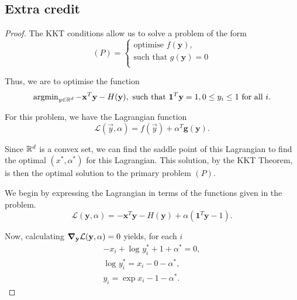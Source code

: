 \documentclass{article}
\begin{document}
\subsection{Extra credit}
\begin{proof}
    The KKT conditions allow us to solve a problem of the form
    \begin{equation*}
        (P) = \begin{cases}
            \text{optimise } f(\mathbf{y}),\\
            \text{such that } g(\mathbf{y}) = 0\\
            \end{cases}
    \end{equation*}

    Thus, we are to optimise the function
    \begin{equation*}
        \operatorname{argmin}_{y \in \mathbb{R}^{d}} - \mathbf{x}^{T}\mathbf{y} - H(\mathbf{y}),
        \text{ such that } \mathbf{1}^{T}\mathbf{y} = 1, 0 \leq y_{i} \leq 1 \text{ for all } i.
    \end{equation*}

    For this problem, we have the Lagrangian function
    \begin{equation*}
        \mathcal{L} (\vec{y}, \alpha) = f(\vec{y}) + \alpha^{T}\mathbf{g}(\mathbf{y}).
    \end{equation*}

    Since $\mathbb{R}^{d}$ is a convex set, we can find the saddle point of this Lagrangian to find the optimal $(x^{*}, \alpha^{*})$
    for this Lagrangian. This solution, by the KKT Theorem, is then the optimal solution to the primary problem $(P)$.

    We begin by expressing the Lagrangian in terms of the functions given in the problem.
    \begin{equation*}
        \mathcal{L}(\mathbf{y}, \alpha) = -\mathbf{x}^{T}\mathbf{y} - H(\mathbf{y}) + \alpha(\mathbf{1}^{T}\mathbf{y} - 1).
    \end{equation*}
    
    Now, calculating $\grad_{\mathbf{y}} \mathcal{L}(\mathbf{y, \alpha}) = 0$ yields, for each $i$
    \begin{gather*}
        -x_{i} + \log_{}y_{i}^{*} + 1 + \alpha^{*} = 0,\\
        \log_{}y_{i}^{*} = x_{i} - 0 - \alpha^{*},\\
        y_{i} = \exp{x_{i} - 1 - \alpha^{*}}.
    \end{gather*}


\end{proof}
\end{document}
